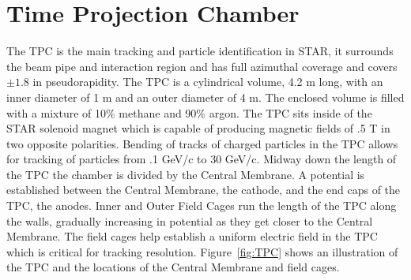 \section{Time Projection Chamber}

The TPC is the main tracking and particle identification in STAR, it surrounds the beam pipe and interaction region and has full azimuthal coverage and covers $\pm 1.8$ in pseudorapidity. The TPC is a cylindrical volume, 4.2 m long, with an inner diameter of 1 m and an outer diameter of 4 m. The enclosed volume is filled with a mixture of 10\% methane and 90\% argon. The TPC sits inside of the STAR solenoid magnet which is capable of producing magnetic fields of .5 T in two opposite polarities. Bending of tracks of charged particles in the TPC allows for tracking of particles from .1 GeV/c to 30 GeV/c. Midway down the length of the TPC the chamber is divided by the Central Membrane. A potential is established between the Central Membrane, the cathode, and the end caps of the TPC, the anodes. Inner and Outer Field Cages run the length of the TPC along the walls, gradually increasing in potential as they get closer to the Central Membrane. The field cages help establish a uniform electric field in the TPC which is critical for tracking resolution. Figure~\ref{fig:TPC} shows an illustration of the TPC and the locations of the Central Membrane and field cages.


